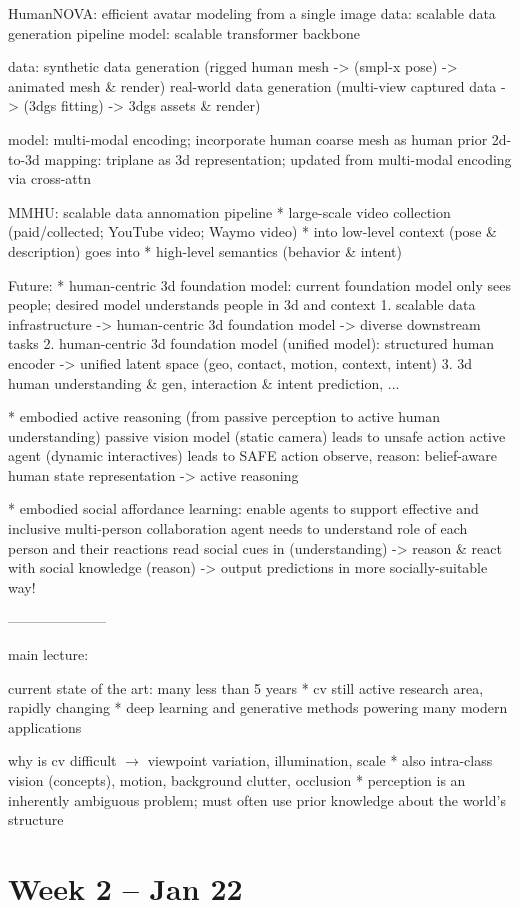 \documentclass[11pt, oneside]{book}
\begin{document}
HumanNOVA: efficient avatar modeling from a single image
    data: scalable data generation pipeline
    model: scalable transformer backbone

data: synthetic data generation (rigged human mesh -> (smpl-x pose) -> animated mesh & render)
      real-world data generation (multi-view captured data -> (3dgs fitting) -> 3dgs assets & render)

model: multi-modal encoding; incorporate human coarse mesh as human prior
       2d-to-3d mapping: triplane as 3d representation; updated from multi-modal encoding via cross-attn

MMHU: scalable data annomation pipeline
    * large-scale video collection (paid/collected; YouTube video; Waymo video)
        * into low-level context (pose & description) goes into
            * high-level semantics (behavior & intent)

Future:
    * human-centric 3d foundation model: current foundation model only sees people;
            desired model understands people in 3d and context
        1. scalable data infrastructure -> human-centric 3d foundation model -> diverse downstream tasks
        2. human-centric 3d foundation model (unified model): structured human encoder -> unified latent space (geo, contact, motion, context, intent)
        3. 3d human understanding & gen, interaction & intent prediction, ...

    * embodied active reasoning (from passive perception to active human understanding)
        passive vision model (static camera) leads to unsafe action
        active agent (dynamic interactives) leads to SAFE action 
            observe, reason: belief-aware human state representation -> active reasoning

    * embodied social affordance learning: enable agents to support effective and inclusive multi-person collaboration
        agent needs to understand role of each person and their reactions
        read social cues in (understanding) -> reason & react with social knowledge (reason) -> output predictions in more socially-suitable way!

---------------------

main lecture:

current state of the art: many less than 5 years
    * cv still active research area, rapidly changing
    * deep learning and generative methods powering many modern applications

    why is cv difficult $\rightarrow$ viewpoint variation, illumination, scale
    * also intra-class vision (concepts), motion, background clutter, occlusion
    * perception is an inherently ambiguous problem; must often use prior knowledge about the world's structure 

\pagebreak

\section{Week 2 -- Jan 22}


\end{document}
